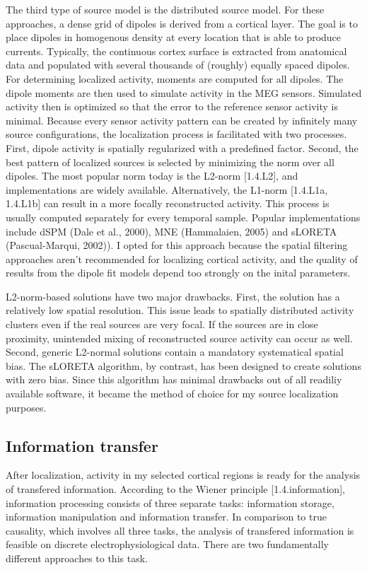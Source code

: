 The third type of source model is the distributed source model.
For these approaches, a dense grid of dipoles is derived from a cortical layer.
The goal is to place dipoles in homogenous density at every location that is able to produce currents.
Typically, the continuous cortex surface is extracted from anatomical data and populated with several thousands of (roughly) equally spaced dipoles.
For determining localized activity, moments are computed for all dipoles.
The dipole moments are then used to simulate activity in the MEG sensors.
Simulated activity then is optimized so that the error to the reference sensor activity is minimal.
Because every sensor activity pattern can be created by infinitely many source configurations, the localization process is facilitated with two processes.
First, dipole activity is spatially regularized with a predefined factor.
Second, the best pattern of localized sources is selected by minimizing the norm over all dipoles.
The most popular norm today is the L2-norm [1.4.L2], and implementations are widely available.
Alternatively, the L1-norm [1.4.L1a, 1.4.L1b] can result in a more focally reconstructed activity.
This process is usually computed separately for every temporal sample.
Popular implementations include dSPM (Dale et al., 2000), MNE (Hammalaien, 2005) and sLORETA (Pascual-Marqui, 2002)).
I opted for this approach because the spatial filtering approaches aren't recommended for localizing cortical activity, and the quality of results from the dipole fit models depend too strongly on the inital parameters.

L2-norm-based solutions have two major drawbacks.
First, the solution has a relatively low spatial resolution.
This issue leads to spatially distributed activity clusters even if the real sources are very focal.
If the sources are in close proximity, unintended mixing of reconstructed source activity can occur as well.
Second, generic L2-normal solutions contain a mandatory systematical spatial bias.
The sLORETA algorithm, by contrast, has been designed to create solutions with zero bias.
Since this algorithm has minimal drawbacks out of all readiliy available software, it became the method of choice for my source localization purposes.

\subsection{Information transfer}
After localization, activity in my selected cortical regions is ready for the analysis of transfered information.
According to the Wiener principle [1.4.information], information processing consists of three separate tasks: information storage, information manipulation and information transfer.
In comparison to true causality, which involves all three tasks, the analysis of transfered information is feasible on discrete electrophysiological data. 
There are two fundamentally different approaches to this task.



